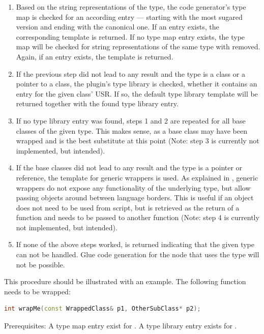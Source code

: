 \begin{enumerate}
\item Based on the string representations of the type, the code generator's type map is checked for an according entry --- starting with the most sugared version and ending with the canonical one. If an entry exists, the corresponding template is returned. If no type map entry exists, the type map will be checked for string representations of the same type with  removed. Again, if an entry exists, the template is returned.
\item If the previous step did not lead to any result and the type is a class or a pointer to a class, the plugin's type library is checked, whether it contains an entry for the given class' USR. If so, the default type library template will be returned together with the found type library entry.
\item If no type library entry was found, steps 1 and 2 are repeated for all base classes of the given type. This makes sense, as a base class may have been wrapped and is the best substitute at this point (Note: step 3 is currently not implemented, but intended).
\item If the base classes did not lead to any result and the type is a pointer or reference, the template for generic wrappers is used. As explained in , generic wrappers do not expose any functionality of the underlying type, but allow passing objects around between language borders. This is useful if an object does not need to be used from script, but is retrieved as the return of a  function and needs to be passed to another  function (Note: step 4 is currently not implemented, but intended).
\item If none of the above steps worked,  is returned indicating that the given  type can not be handled. Glue code generation for the node that uses the type will not be possible.
\end{enumerate}

This procedure should be illustrated with an example. The following function needs to be wrapped:

\SingleSpacing
\begin{lstlisting}[language=C++, caption=Example function illustrating type resolution]
int wrapMe(const WrappedClass& p1, OtherSubClass* p2);
\end{lstlisting}
\OnehalfSpacing

Prerequisites: A type map entry exist for . A type library entry exists for .

